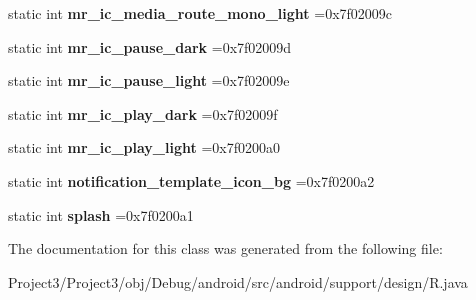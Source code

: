 \begin{DoxyCompactItemize}
\mbox{\label{classandroid_1_1support_1_1design_1_1R_1_1drawable_a2c9d2163c6dc93cde6a7f2ee9b11379b}} 
static int {\bfseries mr\+\_\+ic\+\_\+media\+\_\+route\+\_\+mono\+\_\+light} =0x7f02009c
\item 
\mbox{\label{classandroid_1_1support_1_1design_1_1R_1_1drawable_abcf50aa3d183df6693c680c48b8cfa5a}} 
static int {\bfseries mr\+\_\+ic\+\_\+pause\+\_\+dark} =0x7f02009d
\item 
\mbox{\label{classandroid_1_1support_1_1design_1_1R_1_1drawable_adaec5d03190f23f064f709acac23b9cd}} 
static int {\bfseries mr\+\_\+ic\+\_\+pause\+\_\+light} =0x7f02009e
\item 
\mbox{\label{classandroid_1_1support_1_1design_1_1R_1_1drawable_ac61e88c5feb2c1440c6471d68805542e}} 
static int {\bfseries mr\+\_\+ic\+\_\+play\+\_\+dark} =0x7f02009f
\item 
\mbox{\label{classandroid_1_1support_1_1design_1_1R_1_1drawable_a6439b08bc2d78e99ad0b236b459f2a44}} 
static int {\bfseries mr\+\_\+ic\+\_\+play\+\_\+light} =0x7f0200a0
\item 
\mbox{\label{classandroid_1_1support_1_1design_1_1R_1_1drawable_a4e37ede314ae6daf7a58bfde506e7efb}} 
static int {\bfseries notification\+\_\+template\+\_\+icon\+\_\+bg} =0x7f0200a2
\item 
\mbox{\label{classandroid_1_1support_1_1design_1_1R_1_1drawable_a47d18b58f830bfd5ad05230cc33d866b}} 
static int {\bfseries splash} =0x7f0200a1
\end{DoxyCompactItemize}


The documentation for this class was generated from the following file\+:\begin{DoxyCompactItemize}
\item 
Project3/\+Project3/obj/\+Debug/android/src/android/support/design/R.\+java\end{DoxyCompactItemize}
